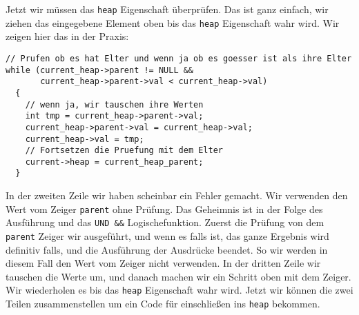 Jetzt wir müssen das \texttt{heap} Eigenschaft überprüfen. Das ist ganz einfach, 
wir ziehen das eingegebene Element oben bis das \texttt{heap} Eigenschaft wahr wird.
Wir zeigen hier das in der Praxis:
\begin{lstlisting}
// Prufen ob es hat Elter und wenn ja ob es goesser ist als ihre Elter
while (current_heap->parent != NULL &&
       current_heap->parent->val < current_heap->val)
  {
    // wenn ja, wir tauschen ihre Werten
    int tmp = current_heap->parent->val;
    current_heap->parent->val = current_heap->val;
    current_heap->val = tmp;
    // Fortsetzen die Pruefung mit dem Elter
    current->heap = current_heap_parent;
  }
\end{lstlisting}
In der zweiten Zeile wir haben scheinbar ein Fehler gemacht. Wir verwenden
den Wert vom Zeiger \texttt{parent} ohne Prüfung. 
Das Geheimnis ist in der
Folge des Ausführung und das \texttt{UND \&\&} Logischefunktion.
Zuerst die Prüfung 
von dem \texttt{parent} Zeiger wir ausgeführt, und wenn es falls ist, das
ganze Ergebnis wird definitiv falls, und die Ausführung der Ausdrücke beendet. 
So wir werden in diesem Fall den Wert vom Zeiger nicht verwenden.
In der dritten Zeile wir tauschen die Werte um, und danach machen
wir ein Schritt oben mit dem Zeiger. Wir wiederholen es bis
das \texttt{heap} Eigenschaft wahr wird. Jetzt wir können die zwei Teilen
zusammenstellen um ein Code für einschließen ins \texttt{heap} bekommen.

